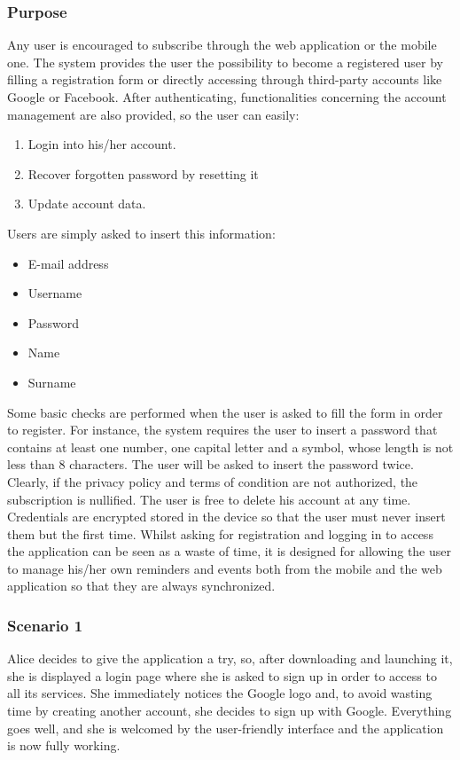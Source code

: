 \subsubsection{Purpose}
Any user is encouraged to subscribe through the web application or the mobile one. The system provides the user the possibility to become a registered user by filling a registration form or directly accessing through third-party accounts like Google or Facebook. After authenticating, functionalities concerning the account management are also provided, so the user can easily:
\begin{enumerate}
	\item Login into his/her account.
    \item Recover forgotten password by resetting it
    \item Update account data.
\end{enumerate}
Users are simply asked to insert this information:
\begin{itemize}
	\item E-mail address
	\item Username
	\item Password
    \item Name
    \item Surname
\end{itemize}
Some basic checks are performed when the user is asked to fill the form in order to register. For instance, the system requires the user to insert a password that contains at least one number, one capital letter and a symbol, whose length is not less than 8 characters. The user will be asked to insert the password twice. Clearly, if the privacy policy and terms of condition are not authorized, the subscription is nullified. The user is free to delete his account at any time. Credentials are encrypted stored in the device so that the user must never insert them but the first time. Whilst asking for registration and logging in to access the application can be seen as a waste of time, it is designed for allowing the user to manage his/her own reminders and events both from the mobile and the web application so that they are always synchronized.
\subsubsection{Scenario 1}
Alice decides to give the application a try, so, after downloading and launching it, she is displayed a login page where she is asked to sign up in order to access to all its services. She immediately notices the Google logo and, to avoid wasting time by creating another account, she decides to sign up with Google. Everything goes well, and she is welcomed by the user-friendly interface and the application is now fully working.
